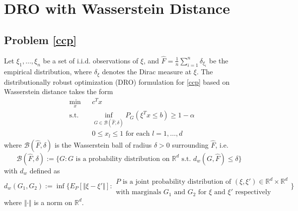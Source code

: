 \documentclass[11pt]{article}
\newcommand{\R}{\mathbb{R}}
\begin{document}
\section{DRO with Wasserstein Distance}
\subsection{Problem \eqref{ccp}}
Let $\xi_1,\ldots,\xi_n$ be a set of i.i.d. observations of $\xi$, and $\hat F=\frac{1}{n}\sum_{i=1}^n\delta_{\xi_i}$ be the empirical distribution, where $\delta_{\xi}$ denotes the Dirac measure at $\xi$. The distributionally robust optimization (DRO) formulation for \eqref{ccp} based on Wasserstein distance takes the form
\begin{equation}\label{robust ccp}
\begin{aligned}
& \underset{x}{\text{min}}
& & c^Tx \\
& \text{s.t.}
& & \inf_{G\in \mathcal B(\hat F,\delta)}P_G(\xi^Tx\leq b)\geq 1-\alpha\\
&& & 0\leq x_l\leq 1\text{ for each }l=1,\ldots,d
\end{aligned}
\end{equation}
where $ \mathcal B(\hat F,\delta)$ is the Wasserstein ball of radius $\delta>0$ surrounding $\hat F$, i.e.
\begin{equation*}
\mathcal B(\hat F,\delta):=\{G:G\text{ is a probability distribution on }\R^d\text{ s.t. }d_w(G,\hat F)\leq \delta\}
\end{equation*}
with $d_w$ defined as
\begin{equation*}
d_w(G_1,G_2):=\inf\Big\{E_P[\Vert \xi-\xi'\Vert]:
\begin{array}{l}
P\text{ is a joint probability distribution of }(\xi,\xi')\in\R^d\times \R^d\\
  \text{with marginals }G_1\text{ and }G_2\text{ for $\xi$ and $\xi'$ respectively}
\end{array}
\Big\}
\end{equation*}
where $\Vert\cdot \Vert$ is a norm on $\R^d$.
\end{document}
